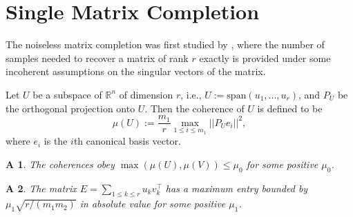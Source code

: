 \documentclass{article} %
\newtheorem{assumption}{A}
\begin{document}
\section{Single Matrix Completion}
The noiseless matrix completion was first studied by \cite{candes2009exact}, where the number of samples needed to recover a matrix of rank $r$ exactly is provided under some incoherent assumptions on the singular vectors of the matrix.
\begin{definition}
Let $U$ be a subspace of $\mathbb{R}^n$ of dimension $r$, i.e., $U := \text{span}(u_1, ..., u_r)$, and $P_U$ be the orthogonal projection onto $U$. Then the coherence of $U$ is defined to be
\begin{equation}
\mu(U) := \frac{m_1}{r}\max_{1\leq i \leq m_1}||P_U e_i||^2,
\end{equation}
where $e_i$ is the $i$th canonical basis vector.
\end{definition}

\begin{assumption}
The coherences obey $\max(\mu(U),\mu(V)) \leq \mu_0$ for some positive $\mu_0$.
\end{assumption}
\begin{assumption}
The matrix $E=\sum_{1\leq k \leq r} u_k v_k^\top$ has a maximum entry bounded by $\mu_1 \sqrt{r/(m_1m_2)}$ in absolute value for some positive $\mu_1$.
\end{assumption}
\end{document}
